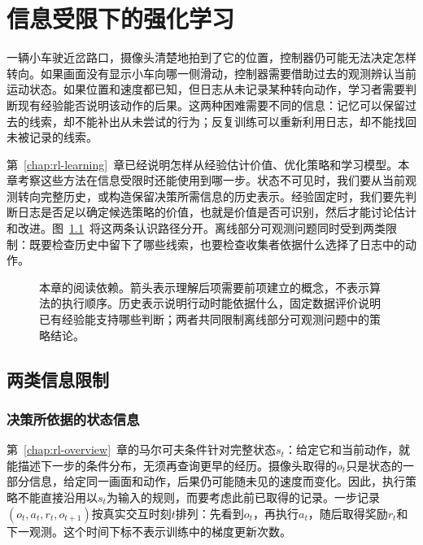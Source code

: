 \chapter{信息受限下的强化学习}
\label{chap:rl-information}

一辆小车驶近岔路口，摄像头清楚地拍到了它的位置，控制器仍可能无法决定怎样转向。如果画面没有显示小车向哪一侧滑动，控制器需要借助过去的观测辨认当前运动状态。如果位置和速度都已知，但日志从未记录某种转向动作，学习者需要判断现有经验能否说明该动作的后果。这两种困难需要不同的信息：记忆可以保留过去的线索，却不能补出从未尝试的行为；反复训练可以重新利用日志，却不能找回未被记录的线索。

第~\ref{chap:rl-learning}~章已经说明怎样从经验估计价值、优化策略和学习模型。本章考察这些方法在信息受限时还能使用到哪一步。状态不可见时，我们要从当前观测转向完整历史，或构造保留决策所需信息的历史表示。经验固定时，我们要先判断日志是否足以确定候选策略的价值，也就是价值是否可识别，然后才能讨论估计和改进。图~\ref{fig:rl-information-roadmap}~将这两条认识路径分开。离线部分可观测问题同时受到两类限制：既要检查历史中留下了哪些线索，也要检查收集者依据什么选择了日志中的动作。

\begin{figure}[htbp]
  \centering
  
  \caption{本章的阅读依赖。箭头表示理解后项需要前项建立的概念，不表示算法的执行顺序。历史表示说明行动时能依据什么，固定数据评价说明已有经验能支持哪些判断；两者共同限制离线部分可观测问题中的策略结论。}
  \label{fig:rl-information-roadmap}
\end{figure}

\section{两类信息限制}
\label{sec:rl-information-limits}

\subsection{决策所依据的状态信息}
\label{sec:rl-information-state-information}

第~\ref{chap:rl-overview}~章的马尔可夫条件针对完整状态$s_t$：给定它和当前动作，就能描述下一步的条件分布，无须再查询更早的经历。摄像头取得的$o_t$只是状态的一部分信息，给定同一画面和动作，后果仍可能随未见的速度而变化。因此，执行策略不能直接沿用以$s_t$为输入的规则，而要考虑此前已取得的记录。一步记录$(o_t,a_t,r_t,o_{t+1})$按真实交互时刻$t$排列：先看到$o_t$，再执行$a_t$，随后取得奖励$r_t$和下一观测。这个时间下标不表示训练中的梯度更新次数。

